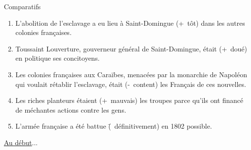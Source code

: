 \begin{frame}{Comparatifs}
  \begin{enumerate}
    \item L'abolition de l'esclavage a eu lieu à Saint-Domingue \underline{} (+~tôt) dans les autres colonies françaises.
    \item Toussaint Louverture, gouverneur général de Saint-Domingue, était \underline{} (+~doué) en politique \underline{} ses concitoyens.
    \item Les colonies françaises aux Caraïbes, menacées par la monarchie de Napoléon qui voulait rétablir l'esclavage, était \underline{} (-~content) les Français de ces nouvelles.
    \item Les riches planteurs étaient \underline{} (+~mauvais) les troupes parce qu'ils ont financé de méchantes actions contre les gens.
    \item L'armée française a été battue \underline{} (\=~définitivement) en 1802 \underline{} possible.
  \end{enumerate}
  \raggedleft
  \hyperlink{début}{Au début}...
\end{frame}